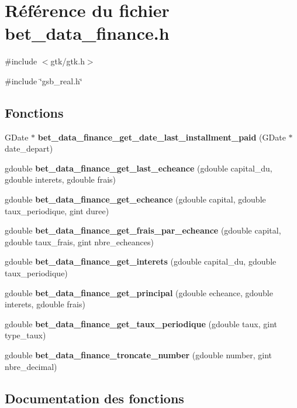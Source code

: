 \section{Référence du fichier bet\_\-data\_\-finance.h}
\label{bet__data__finance_8h}
{\ttfamily \#include $<$gtk/gtk.h$>$}\par
{\ttfamily \#include \char`\"{}gsb\_\-real.h\char`\"{}}\par
\subsection*{Fonctions}
\begin{DoxyCompactItemize}
\item 
GDate $\ast$ {\bf bet\_\-data\_\-finance\_\-get\_\-date\_\-last\_\-installment\_\-paid} (GDate $\ast$date\_\-depart)
\item 
gdouble {\bf bet\_\-data\_\-finance\_\-get\_\-last\_\-echeance} (gdouble capital\_\-du, gdouble interets, gdouble frais)
\item 
gdouble {\bf bet\_\-data\_\-finance\_\-get\_\-echeance} (gdouble capital, gdouble taux\_\-periodique, gint duree)
\item 
gdouble {\bf bet\_\-data\_\-finance\_\-get\_\-frais\_\-par\_\-echeance} (gdouble capital, gdouble taux\_\-frais, gint nbre\_\-echeances)
\item 
gdouble {\bf bet\_\-data\_\-finance\_\-get\_\-interets} (gdouble capital\_\-du, gdouble taux\_\-periodique)
\item 
gdouble {\bf bet\_\-data\_\-finance\_\-get\_\-principal} (gdouble echeance, gdouble interets, gdouble frais)
\item 
gdouble {\bf bet\_\-data\_\-finance\_\-get\_\-taux\_\-periodique} (gdouble taux, gint type\_\-taux)
\item 
gdouble {\bf bet\_\-data\_\-finance\_\-troncate\_\-number} (gdouble number, gint nbre\_\-decimal)
\end{DoxyCompactItemize}


\subsection{Documentation des fonctions}
